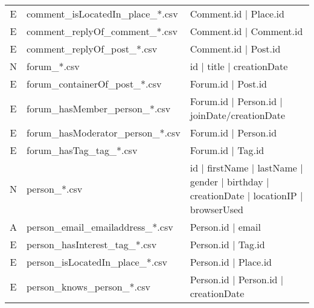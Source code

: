 \begin{table}[htb]
\begin{tabular}{|c|l|l|}
        E                       & comment\_isLocatedIn\_place\_*.csv      & Comment.id | Place.id                                                                   \\
        E                       & comment\_replyOf\_comment\_*.csv        & Comment.id | Comment.id                                                                 \\
        E                       & comment\_replyOf\_post\_*.csv           & Comment.id | Post.id                                                                    \\
        \hline
        N                       & forum\_*.csv                            & id | title | creationDate                                                               \\
        E                       & forum\_containerOf\_post\_*.csv         & Forum.id | Post.id                                                                      \\
        E                       & forum\_hasMember\_person\_*.csv         & Forum.id | Person.id | joinDate/creationDate                                            \\
        E                       & forum\_hasModerator\_person\_*.csv      & Forum.id | Person.id                                                                    \\
        E                       & forum\_hasTag\_tag\_*.csv               & Forum.id | Tag.id                                                                       \\
        \hline
        N                       & person\_*.csv                           & id | firstName | lastName | gender | birthday | creationDate | locationIP | browserUsed \\
        A                       & person\_email\_emailaddress\_*.csv      & Person.id | email                                                                       \\
        E                       & person\_hasInterest\_tag\_*.csv         & Person.id | Tag.id                                                                      \\
        E                       & person\_isLocatedIn\_place\_*.csv       & Person.id | Place.id                                                                    \\
        E                       & person\_knows\_person\_*.csv            & Person.id | Person.id | creationDate                                                    \\

\end{tabular}
\end{table}
